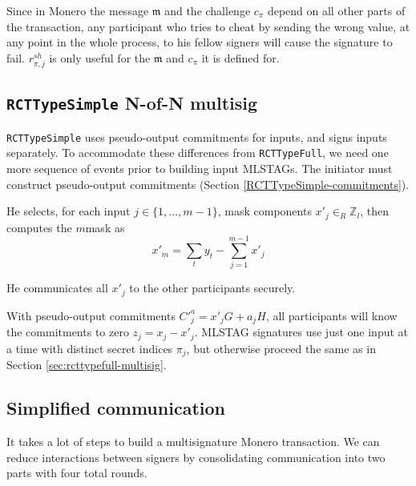 Since in Monero the message $\mathfrak{m}$ and the challenge $c_{\pi}$ depend on all other parts of the transaction, any participant who tries to cheat by sending the wrong value, at any point in the whole process, to his fellow signers will cause the signature to fail. $r^{sh}_{\pi,j}$ is only useful for the $\mathfrak{m}$ and $c_{\pi}$ it is defined for.


\subsection{{\tt RCTTypeSimple} N-of-N multisig}
\label{sec:rcttypesimple-multisig}

{\tt RCTTypeSimple} uses pseudo-output commitments for inputs, and signs inputs separately. To accommodate these differences from {\tt RCTTypeFull}, we need one more sequence of events prior to building input MLSTAGs. The initiator must construct pseudo-output commitments (Section \ref{RCTTypeSimple-commitments}).

He selects, for each input $j \in \{1,...,m-1\}$, mask components $x'_{j} \in_R \mathbb{Z}_l$, then computes the $m$\nth mask as
\[ x'_m = \sum_t y_t - \sum_{j=1}^{m-1} x'_j \]

He communicates all $x'_j$ to the other participants securely.

With pseudo-output commitments $C'^a_j = x'_j G + a_j H$, all participants will know the commitments to zero $z_j = x_j - x'_j$. MLSTAG signatures use just one input at a time with distinct secret indices $\pi_j$, but otherwise proceed the same as in Section \ref{sec:rcttypefull-multisig}.


\subsection{Simplified communication}
\label{sec:simplified-communication}

It takes a lot of steps to build a multisignature Monero transaction. We can reduce interactions between signers by consolidating communication into two parts with four total rounds.

